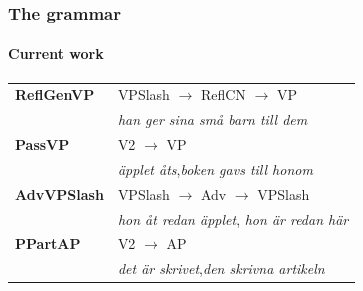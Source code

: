\documentclass[10pt]{beamer}
\begin{document}
\begin{frame}
\frametitle{The grammar}
\framesubtitle{Current work} 
\begin{tabular}{ll}
\alert{\textbf{ReflGenVP}} & \alert{VPSlash $\rightarrow$ ReflCN $\rightarrow$ VP} \\
& \alert{\emph{han ger sina små barn till dem}} \\

\alert{\textbf{PassVP}}
  & \alert{V2 $\rightarrow$ VP} \\ %
& \alert{\emph{äpplet åts},}\alert{\emph{boken gavs till honom}} \\ 

\alert{\textbf{AdvVPSlash}} & \alert{VPSlash $\rightarrow$ Adv $\rightarrow$ VPSlash} \\
& \alert{\emph{hon åt redan äpplet}, \emph{hon är redan här}}\\

\textbf{PPartAP} & V2 $\rightarrow$ AP \\
& \emph{det är skrivet},\emph{den skrivna artikeln}
\end{tabular}\\
\pause
\end{frame}
\end{document}

